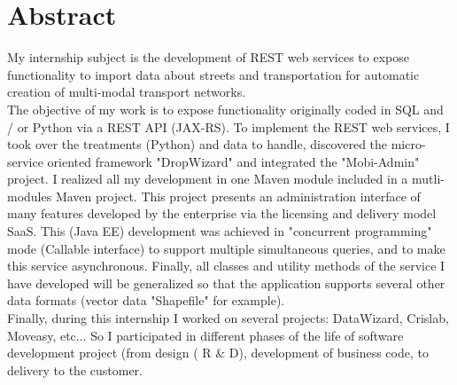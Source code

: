 \chapter*{Abstract}

My internship subject is the development of REST web services to expose functionality to import data about streets and transportation for automatic creation of multi-modal transport networks.\\

The objective of my work is to expose functionality originally coded in SQL and / or Python via a REST API (JAX-RS). To implement the REST web services, I took over the treatments (Python) and data to handle, discovered the micro-service oriented framework "DropWizard" and integrated the "Mobi-Admin" project. I realized all my development in one Maven module included in a mutli-modules Maven project. This project presents an administration interface of many features developed by the enterprise via the licensing and delivery model SaaS. This (Java EE) development was achieved in "concurrent programming" mode (Callable interface) to support multiple simultaneous queries, and to make this service asynchronous. Finally, all classes and utility methods of the service I have developed will be generalized so that the application supports several other data formats (vector data "Shapefile" for example).\\

Finally, during this internship I worked on several projects: DataWizard, Crislab, Moveasy, etc... So I participated in different phases of the life of software development project (from design ( R & D), development of business code, to delivery to the customer.\\